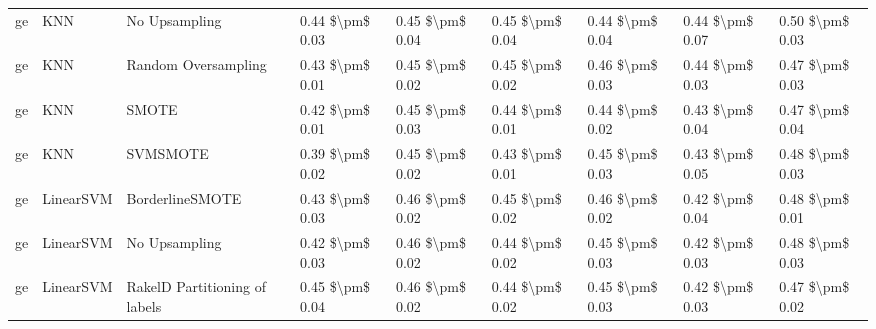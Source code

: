 \begin{tabular}{lllllllll}
      ge &                             KNN &                 No Upsampling & 0.44 \$\textbackslash pm\$ 0.03 &           0.45 \$\textbackslash pm\$ 0.04 &       0.45 \$\textbackslash pm\$ 0.04 &        0.44 \$\textbackslash pm\$ 0.04 &                         0.44 \$\textbackslash pm\$ 0.07 &     0.50 \$\textbackslash pm\$ 0.03 \\
      ge &                             KNN &           Random Oversampling & 0.43 \$\textbackslash pm\$ 0.01 &           0.45 \$\textbackslash pm\$ 0.02 &       0.45 \$\textbackslash pm\$ 0.02 &        0.46 \$\textbackslash pm\$ 0.03 &                         0.44 \$\textbackslash pm\$ 0.03 &     0.47 \$\textbackslash pm\$ 0.03 \\
      ge &                             KNN &                         SMOTE & 0.42 \$\textbackslash pm\$ 0.01 &           0.45 \$\textbackslash pm\$ 0.03 &       0.44 \$\textbackslash pm\$ 0.01 &        0.44 \$\textbackslash pm\$ 0.02 &                         0.43 \$\textbackslash pm\$ 0.04 &     0.47 \$\textbackslash pm\$ 0.04 \\
      ge &                             KNN &                      SVMSMOTE & 0.39 \$\textbackslash pm\$ 0.02 &           0.45 \$\textbackslash pm\$ 0.02 &       0.43 \$\textbackslash pm\$ 0.01 &        0.45 \$\textbackslash pm\$ 0.03 &                         0.43 \$\textbackslash pm\$ 0.05 &     0.48 \$\textbackslash pm\$ 0.03 \\
      ge &                       LinearSVM &               BorderlineSMOTE & 0.43 \$\textbackslash pm\$ 0.03 &           0.46 \$\textbackslash pm\$ 0.02 &       0.45 \$\textbackslash pm\$ 0.02 &        0.46 \$\textbackslash pm\$ 0.02 &                         0.42 \$\textbackslash pm\$ 0.04 &     0.48 \$\textbackslash pm\$ 0.01 \\
      ge &                       LinearSVM &                 No Upsampling & 0.42 \$\textbackslash pm\$ 0.03 &           0.46 \$\textbackslash pm\$ 0.02 &       0.44 \$\textbackslash pm\$ 0.02 &        0.45 \$\textbackslash pm\$ 0.03 &                         0.42 \$\textbackslash pm\$ 0.03 &     0.48 \$\textbackslash pm\$ 0.03 \\
      ge &                       LinearSVM & RakelD Partitioning of labels & 0.45 \$\textbackslash pm\$ 0.04 &           0.46 \$\textbackslash pm\$ 0.02 &       0.44 \$\textbackslash pm\$ 0.02 &        0.45 \$\textbackslash pm\$ 0.03 &                         0.42 \$\textbackslash pm\$ 0.03 &     0.47 \$\textbackslash pm\$ 0.02 \\

\end{tabular}
